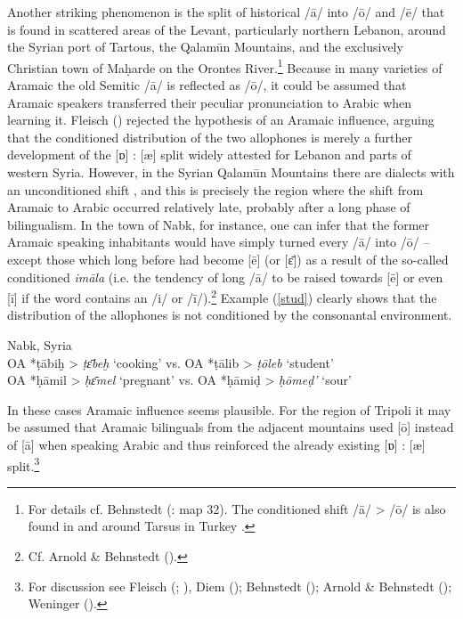 \documentclass[output=paper]{langsci/langscibook}
\begin{document}
Another striking phenomenon is the split of historical /ā/ into /ō/ and /ē/ that is found in scattered areas of the Levant, particularly northern Lebanon, around the Syrian port of Tartous, the Qalamūn Mountains, and the exclusively Christian town of Maḥarde on the Orontes River.\footnote{For details cf. Behnstedt (\citeyear{Behnstedt1997}: map 32). The conditioned shift /ā/ > /ō/ is also found in and around Tarsus in Turkey \citep[37--38]{Procházka2002Cukurova}.} Because in many varieties of Aramaic the old Semitic /ā/ is reflected as /ō/, it could be assumed that Aramaic speakers transferred their peculiar pronunciation to Arabic when learning it. Fleisch (\citeyear[49]{Fleisch1974vowels}) rejected the hypothesis of an Aramaic influence, arguing that the conditioned distribution of the two allophones is merely a further development of the [ɒ] : [æ] split widely attested for Lebanon and parts of western Syria. However, in the Syrian Qalamūn Mountains there are dialects with an unconditioned shift \citep{Behnstedt1992}, and this is precisely the region where the shift from Aramaic to Arabic occurred relatively late, probably after a long phase of bilingualism. In the town of Nabk, for instance, one can infer that the former Aramaic speaking inhabitants would have simply turned every /ā/ into /ō/ – except those which long before had become [ē] (or [ɛ̄]) as a result of the so-called conditioned \textit{imāla} (i.e. the tendency of long /ā/ to be raised towards [ē] or even [ī] if the word contains an /i/ or /ī/).\footnote{Cf. Arnold \& Behnstedt (\citeyear[68]{ArnoldBehnstedt1993}).} Example (\ref{stud}) clearly shows that the distribution of the allophones is not conditioned by the consonantal environment.

\ea\label{ex:prochazka:} \label{stud}
{Nabk, Syria \citep[20]{Gralla2006}} \\
    \textup{OA} *ṭābiḫ > \textit{ṭɛ̄beḫ}  \textup{‘cooking’ vs. OA} *ṭālib > \textit{ṭōleb}  \textup{‘student’}\\
\textup{OA} *ḥāmil > \textit{ḥɛ̄mel} \textup{‘pregnant’ vs. OA} *ḥāmiḍ > \textit{ḥōmeḍ’} \textup{‘sour’}\\
\z

In these cases Aramaic influence seems plausible. For the region of Tripoli it may be assumed that Aramaic bilinguals from the adjacent mountains used [ō] instead of [ā] when speaking Arabic and thus reinforced the already existing [ɒ] : [æ] split.\footnote{For discussion see Fleisch (\citeyear[48--50]{Fleisch1974vowels}; \citeyear[133--136]{Fleisch1974Kfar}), Diem (\citeyear[45--46]{Diem1979}); Behnstedt (\citeyear{Behnstedt1992}); Arnold \& Behnstedt (\citeyear[67--68]{ArnoldBehnstedt1993}); Weninger (\citeyear[748]{Weninger2011Aramaic}).}
\end{document}
